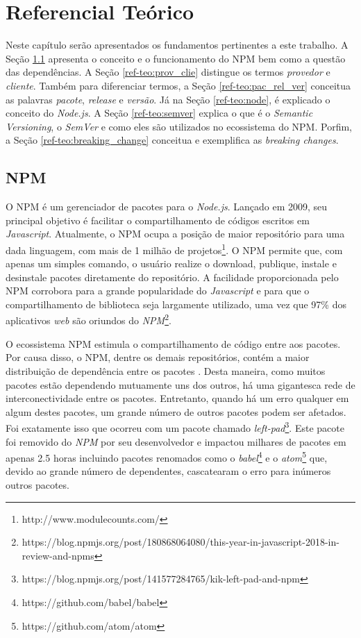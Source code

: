 \chapter{Referencial Teórico}
\label{cap:ref-teorico}
Neste capítulo serão apresentados os fundamentos pertinentes a este trabalho. A Seção \ref{ref-teo:npm} apresenta o conceito e o funcionamento do \gls{NPM} bem como a questão das dependências. A Seção \ref{ref-teo:prov_clie} distingue os termos \textit{provedor} e \textit{cliente}. Também para diferenciar termos, a Seção \ref{ref-teo:pac_rel_ver} conceitua as palavras \textit{pacote}, \textit{release} e \textit{versão}. Já na Seção \ref{ref-teo:node}, é explicado o conceito do \textit{Node.js}. A Seção \ref{ref-teo:semver} explica o que é o \textit{Semantic Versioning}, o \textit{SemVer} e como eles são utilizados no ecossistema do \gls{NPM}. Porfim, a Seção \ref{ref-teo:breaking_change} conceitua e exemplifica as \textit{breaking changes}.

\section{\gls{NPM}}
\label{ref-teo:npm}
O \gls{NPM} é um gerenciador de pacotes para o \textit{Node.js}. Lançado em 2009, seu principal objetivo é facilitar o compartilhamento de códigos escritos em \textit{Javascript}. Atualmente, o \gls{NPM} ocupa a posição de maior repositório para uma dada linguagem, com mais de 1 milhão de projetos\footnote{http://www.modulecounts.com/}. O \gls{NPM} permite que, com apenas um simples comando, o usuário realize o download, publique, instale e desinstale pacotes diretamente do repositório. A facilidade proporcionada pelo \gls{NPM} corrobora para a grande popularidade do \textit{Javascript} e para que o compartilhamento de biblioteca seja largamente utilizado, uma vez que 97\% dos aplicativos \textit{web} são oriundos do \textit{NPM}\footnote{https://blog.npmjs.org/post/180868064080/this-year-in-javascript-2018-in-review-and-npms}.

O ecossistema \gls{NPM} estimula o compartilhamento de código entre aos pacotes. Por causa disso, o \gls{NPM}, dentre os demais repositórios, contém a maior distribuição de dependência entre os pacotes \cite{teorical_reference:npm_2}. Desta maneira, como muitos pacotes estão dependendo mutuamente uns dos outros, há uma gigantesca rede de interconectividade entre os pacotes. Entretanto, quando há um erro qualquer em algum destes pacotes, um grande número de outros pacotes podem ser afetados. Foi exatamente isso que ocorreu com um pacote chamado \textit{left-pad}\footnote{https://blog.npmjs.org/post/141577284765/kik-left-pad-and-npm}. Este pacote foi removido do \textit{NPM} por seu desenvolvedor e impactou milhares de pacotes em apenas 2.5 horas incluindo pacotes renomados como o \textit{babel}\footnote{https://github.com/babel/babel} e o \textit{atom}\footnote{https://github.com/atom/atom} que, devido ao grande número de dependentes, cascatearam o erro para inúmeros outros pacotes.

